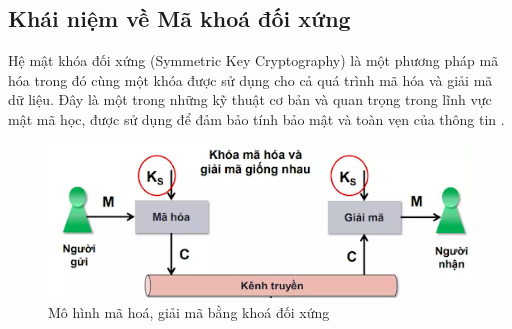 \subsection{Khái niệm về Mã khoá đối xứng}
Hệ mật khóa đối xứng (Symmetric Key Cryptography) là một phương pháp mã hóa trong đó cùng một khóa được sử dụng cho cả quá trình mã hóa và giải mã dữ liệu. Đây là một trong những kỹ thuật cơ bản và quan trọng trong lĩnh vực mật mã học, được sử dụng để đảm bảo tính bảo mật và toàn vẹn của thông tin \cite{galil1986symmetric}.
   \begin{figure}[H]
    \centering
    \includegraphics[scale=0.6]{pic/kn_mmdx.png}
    \caption{ Mô hình mã hoá, giải mã bằng khoá đối xứng}
    
\end{figure}
    


